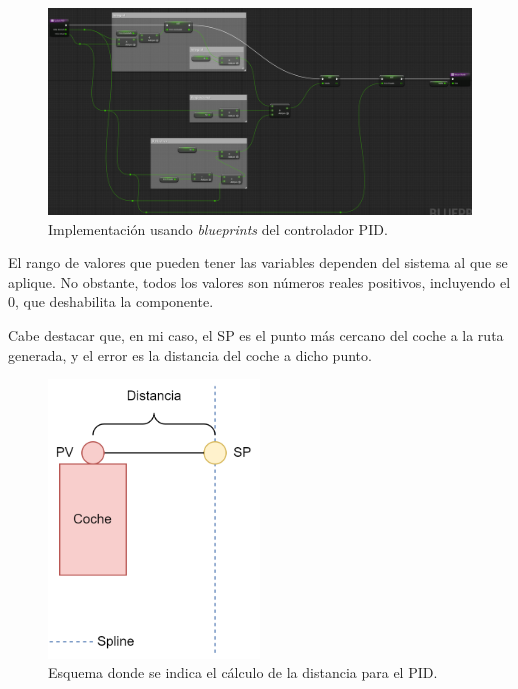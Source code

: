 \begin{figure}[H]
\centering
\includegraphics[width=\textwidth]{imagenes/PID-BP.png}
\caption{Implementación usando \textit{blueprints} del controlador PID.}
\label{fig:pidbp}
\end{figure}

El rango de valores que pueden tener las variables dependen del sistema al que se aplique. No obstante, todos los valores son números reales positivos, incluyendo el 0, que deshabilita la componente.

\bigskip

Cabe destacar que, en mi caso, el SP es el punto más cercano del coche a la ruta generada, y el error es la distancia del coche a dicho punto.

\begin{figure}[H]
    \centering
    \includegraphics[width=0.5\textwidth]{imagenes/errorPID.png}
    \caption{Esquema donde se indica el cálculo de la distancia para el PID.}
    \label{fig:errorpid}
    \end{figure}

